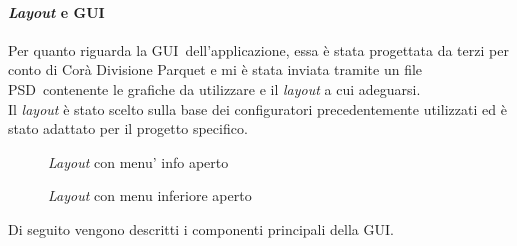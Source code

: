 \paragraph{\textit{Layout} e GUI\gloss}
Per quanto riguarda la GUI\gloss\ dell'applicazione, essa \`e stata progettata da terzi per conto di Cor\`a Divisione Parquet e mi \`e stata inviata tramite un file PSD\gloss\ contenente le grafiche da utilizzare e il \textit{layout} a cui adeguarsi.\\
Il \textit{layout} \`e stato scelto sulla base dei configuratori precedentemente utilizzati ed \`e stato adattato per il progetto specifico.

\begin{figure}[H]
	\centering
	\caption{\textit{Layout} con menu' info aperto}
	\label{fig:Layout con menu info aperto}
\end{figure}

\begin{figure}[H]
	\centering
	\caption{\textit{Layout} con menu inferiore aperto}
	\label{fig:Layout con menu inferiore aperto}
\end{figure}
\newpage
\noindent
Di seguito vengono descritti i componenti principali della GUI\gloss .

